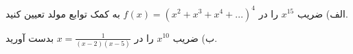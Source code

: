 \exercise
الف) ضریب
$x^{15}$
را در
$f(x) = (x^{2} + x^{3} + x^{4} + ...)^4$
به کمک توابع مولد تعیین کنید.

ب) ضریب
$x^{10}$
را در
$x = \frac{1}{(x-2)(x-5)}$
بدست آورید.